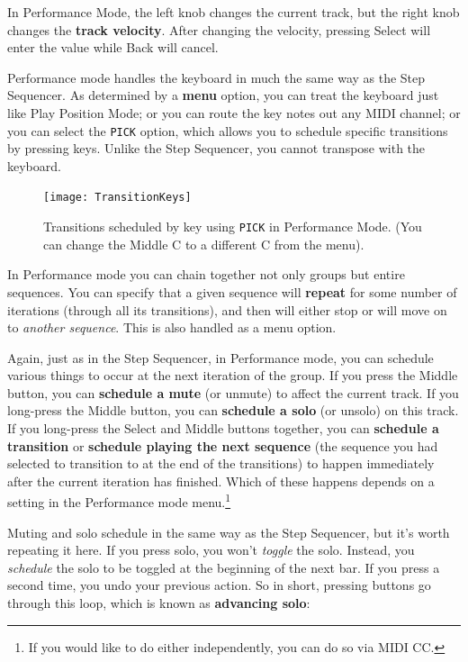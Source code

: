 \documentclass{article}
\begin{document}
In Performance Mode, the left knob changes the current track, but the right knob changes the {\bf track velocity}.  After changing the velocity, pressing Select will enter the value while Back will cancel.  

Performance mode handles the keyboard in much the same way as the Step Sequencer.  As determined by a {\bf menu} option, you can treat the keyboard just like Play Position Mode; or you can route the key notes out any MIDI channel; or you can select the {\tt PICK} option, which allows you to schedule specific transitions by pressing keys.  Unlike the Step Sequencer, you cannot transpose with the keyboard.

\begin{figure}
\vspace{-0.5em}
\hspace{\fill}\texttt{[image: TransitionKeys]}
\vspace{-1.5em}
\caption{\small Transitions scheduled by key using {\tt PICK} in Performance Mode. (You can change the Middle C to a different C from the menu).}
\vspace{-1em}
\label{transitionkeys}
\end{figure}

In Performance mode you can chain together not only groups but entire sequences.  You can specify that a given sequence will {\bf repeat} for some number of iterations (through all its transitions), and then will either stop or will move on to {\it another sequence}.  This is also handled as a menu option.

Again, just as in the Step Sequencer, in Performance mode, you can schedule various things to occur at the next iteration of the group.  If you press the Middle button, you can {\bf schedule a mute} (or unmute) to affect the current track.  If you long-press the Middle button, you can {\bf schedule a solo} (or unsolo) on this track.  If you long-press the Select and Middle buttons together, you can {\bf schedule a transition} or {\bf schedule playing the next sequence} (the sequence you had selected to transition to at the end of the transitions) to happen immediately after the current iteration has finished.  Which of these happens depends on a setting in the Performance mode menu.\footnote{If you would like to do either independently, you can do so via MIDI CC.}

Muting and solo schedule in the same way as the Step Sequencer, but it's worth repeating it here. If you press solo, you won't {\it toggle} the solo.  Instead, you {\it schedule} the solo to be toggled at the beginning of the next bar.  If you press a second time, you undo your previous action.  So in short, pressing buttons go through this loop, which is known as {\bf advancing solo}:
\end{document}
